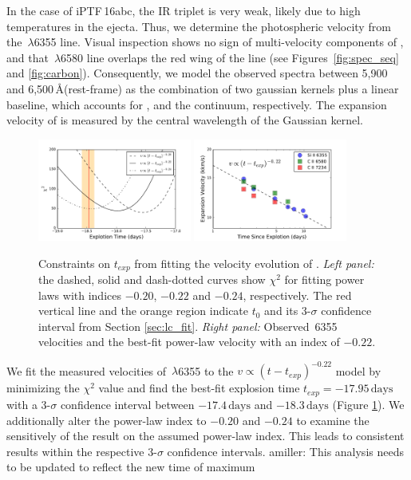 \documentclass[twocolumn]{aastex61}
\newcommand{\abc}{iPTF\,16abc}
\newcommand{\amiller}[1]{{\color{blue} amiller: {#1}}}
\begin{document}
In the case of \abc, the  IR triplet is very weak, 
likely due to high temperatures in the ejecta. Thus, we
determine the photospheric velocity from the 
\,$\lambda$6355 line. Visual inspection shows no 
sign of multi-velocity components of , and that 
\,$\lambda$6580 line overlaps the red
wing of the  line (see Figures~\ref{fig:spec_seq} and \ref{fig:carbon}). Consequently, we model the observed 
spectra between 5,900 and 6,500\,\AA (rest-frame) as the combination 
of two gaussian kernels plus a linear baseline, which
accounts for ,  and the
continuum, respectively. The expansion
velocity of  is measured by the central wavelength
of the  Gaussian kernel.

\begin{figure}[!thb]
  \centering
  \includegraphics[width=0.45\textwidth]{Chi2.pdf}
  \includegraphics[width=0.45\textwidth]{VelocityPlot.pdf}
  \caption{Constraints on $t_{exp}$ from fitting the velocity
    evolution of .
    \textit{Left panel:} the dashed, solid
    and dash-dotted curves show $\chi^2$ for fitting power laws with
    indices $-0.20$, $-0.22$ and $-0.24$, respectively. The red
    vertical line and the orange region indicate $t_0$ and its
    3-$\sigma$ confidence interval from Section
    \ref{sec:lc_fit}.
    \textit{Right panel:} Observed \,6355
    velocities and the best-fit power-law velocity with an index of
    $-0.22$.}
  \label{fig:velocity_t_exp}
\end{figure}

We fit the measured velocities of \,$\lambda$6355 to the
$v\propto(t-t_{exp})^{-0.22}$ model by minimizing the $\chi^2$ value
and find the best-fit explosion time $t_{exp} = -17.95\,\textrm{days}$
with a 3-$\sigma$ confidence interval between $-17.4\,\textrm{days}$
and $-18.3\,\textrm{days}$ (Figure \ref{fig:velocity_t_exp}). We additionally
alter the power-law index to $-0.20$ and $-0.24$ to examine the
sensitively of the result on the assumed power-law index.  This 
leads to consistent results within the respective 3-$\sigma$ 
confidence intervals. \amiller{This analysis needs to be updated to reflect the new time of maximum}
\end{document}
